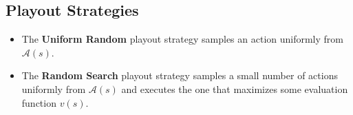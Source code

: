 \documentclass{article}
\newcommand{\actions}{\mathcal{A}}
\newcommand{\state}{s}
\newcommand{\evaluator}{v}
\begin{document}
\subsection{Playout Strategies} \label{sec:playout-strategies}



\begin{itemize}
\item The \textbf{Uniform Random} playout strategy samples an action uniformly from $\actions(\state)$. \\
\item The \textbf{Random Search} playout strategy samples a small number of actions uniformly from $\actions(\state)$ and executes the one that maximizes some evaluation function $\evaluator(\state)$. \\
\end{itemize}
\end{document}
